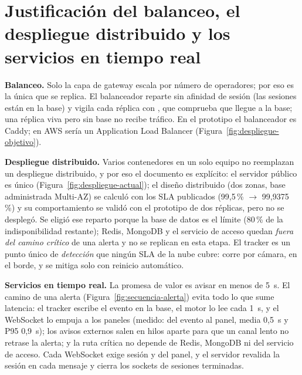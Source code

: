 \section{Justificación del balanceo, el despliegue distribuido y los servicios en tiempo real}
\textbf{Balanceo.} Solo la capa de gateway escala por número de operadores; por eso es la única que se replica. El balanceador reparte sin
afinidad de sesión (las sesiones están en la base) y vigila cada réplica con , que comprueba que llegue a la base; una réplica
viva pero sin base no recibe tráfico. En el prototipo el balanceador es Caddy; en AWS sería un Application Load Balancer (Figura~\ref{fig:despliegue-objetivo}).

\textbf{Despliegue distribuido.} Varios contenedores en un solo equipo no reemplazan un despliegue distribuido, y por eso el documento es
explícito: el servidor público es único (Figura~\ref{fig:despliegue-actual}); el diseño distribuido (dos zonas, base administrada Multi-AZ) se calculó
con los SLA publicados (99,5\,\% $\rightarrow$ 99,9375\,\%) y su comportamiento se validó con el prototipo de dos réplicas, pero no se desplegó. Se
eligió ese reparto porque la base de datos es el límite (80\,\% de la indisponibilidad restante); Redis, MongoDB y el servicio de acceso quedan
\emph{fuera del camino crítico} de una alerta y no se replican en esta etapa. El tracker es un punto único de \emph{detección} que ningún SLA de
la nube cubre: corre por cámara, en el borde, y se mitiga solo con reinicio automático.

\textbf{Servicios en tiempo real.} La promesa de valor es avisar en menos de 5~s. El camino de una alerta (Figura~\ref{fig:secuencia-alerta})
evita todo lo que sume latencia: el tracker escribe el evento en la base, el motor lo lee cada 1~s, y el WebSocket lo empuja a los paneles
(medido: del evento al panel, media 0,5~s y P95 0,9~s); los avisos externos salen en hilos aparte para que un canal lento no retrase la alerta;
y la ruta crítica no depende de Redis, MongoDB ni del servicio de acceso. Cada WebSocket exige sesión y  del panel, y el servidor
revalida la sesión en cada mensaje y cierra los sockets de sesiones terminadas.
